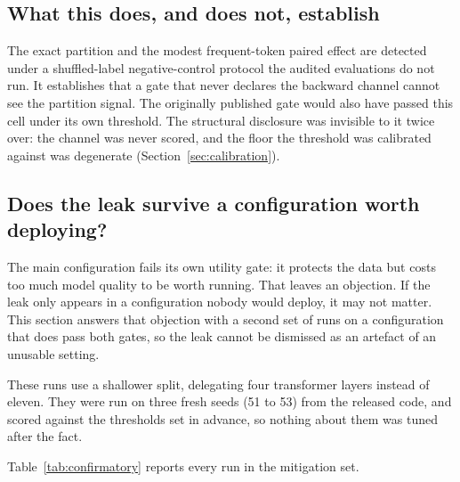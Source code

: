 \documentclass[11pt]{article}
\begin{document}
\subsection{What this does, and does not, establish}

The exact partition and the modest frequent-token paired effect are detected
under a shuffled-label negative-control protocol the audited evaluations do not
run. It establishes that a gate that never
declares the backward channel cannot see the partition signal. The originally
published gate would also have passed this cell under its own threshold. The
structural disclosure was invisible to it twice over: the channel was never
scored, and the floor the threshold was calibrated against was degenerate
(Section~\ref{sec:calibration}).

\subsection{Does the leak survive a configuration worth deploying?}
\label{sec:confirmatory}

The main configuration fails its own utility gate: it protects the data but
costs too much model quality to be worth running. That leaves an objection.
If the leak only appears in a configuration nobody would deploy, it may not
matter. This section answers that objection with a second set of runs on a
configuration that does pass both gates, so the leak cannot be dismissed as an
artefact of an unusable setting.

These runs use a shallower split, delegating four transformer layers instead of
eleven. They were run on three fresh seeds (51 to 53) from the released code,
and scored against the thresholds set in advance, so nothing about them was
tuned after the fact.

Table~\ref{tab:confirmatory} reports every run in the mitigation set.
\end{document}
